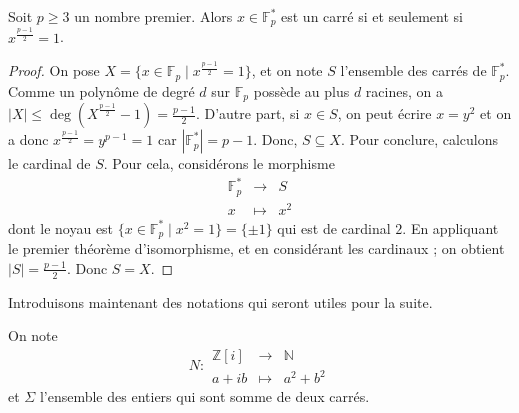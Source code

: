 






	\begin{lemma}
		\label{theoreme-des-deux-carres-fermat-1}
		Soit $p \geq 3$ un nombre premier. Alors $x \in \mathbb{F}^*_p$ est un carré si et seulement si $x^{\frac{p-1}{2}} = 1$.
	\end{lemma}

	\begin{proof}
		On pose $X = \{ x \in \mathbb{F}_p \mid x^{\frac{p-1}{2}} = 1 \}$, et on note $S$ l'ensemble des carrés de $\mathbb{F}_p^*$. Comme un polynôme de degré $d$ sur $\mathbb{F}_p$ possède au plus $d$ racines, on a $|X| \leq \deg \left( X^{\frac{p-1}{2}} - 1 \right) = \frac{p-1}{2}$.
		\newpar
		D'autre part, si $x \in S$, on peut écrire $x = y^2$ et on a donc $x^{\frac{p-1}{2}} = y^{p-1} = 1$ car $|\mathbb{F}_p^*| = p-1$. Donc, $S \subseteq X$.
		\newpar
		Pour conclure, calculons le cardinal de $S$. Pour cela, considérons le morphisme
		\[
		\begin{array}{ccc}
			\mathbb{F}_p^* &\rightarrow& S \\
			x &\mapsto& x^2
		\end{array}
		\]
		dont le noyau est $\{ x \in \mathbb{F}_p^* \mid x^2 = 1 \} = \{ \pm 1 \}$ qui est de cardinal $2$. En appliquant le premier théorème d'isomorphisme, et en considérant les cardinaux ; on obtient $|S| = \frac{p-1}{2}$. Donc $S = X$.
	\end{proof}

	Introduisons maintenant des notations qui seront utiles pour la suite.

	\begin{notation}
		On note \[ N :
		\begin{array}{ccc}
			\mathbb{Z}[i] &\rightarrow& \mathbb{N} \\
			a+ib &\mapsto& a^2 + b^2
		\end{array}
		\] et $\Sigma$ l'ensemble des entiers qui sont somme de deux carrés.
	\end{notation}

